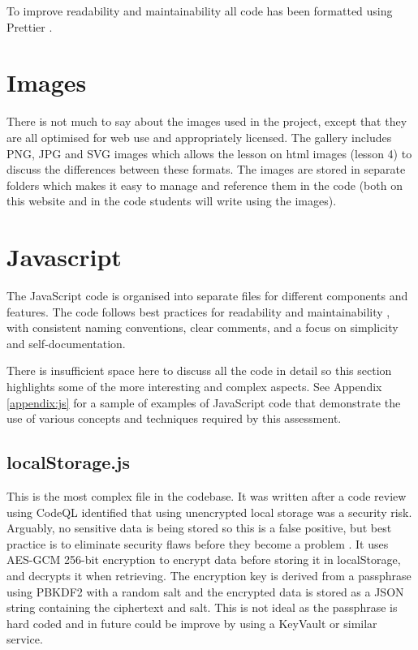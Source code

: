 \documentclass[a4paper, 12pt]{article}
\begin{document}
To improve readability and maintainability all code has been formatted using Prettier \citep{prettier2024}.

\section{Images}
There is not much to say about the images used in the project, except that they are all optimised for web use and appropriately licensed. The gallery includes PNG, JPG and SVG images which allows the lesson on html images (lesson 4) to discuss the differences between these formats. The images are stored in separate folders which makes it easy to manage and reference them in the code (both on this website and in the code students will write using the images).

\section{Javascript}
The JavaScript code is organised into separate files for different components and features. The code follows best practices for readability and maintainability \citep{McConnell2004}, with consistent naming conventions, clear comments, and a focus on simplicity and self-documentation. 

There is insufficient space here to discuss all the code in detail so this section highlights some of the more interesting and complex aspects. See Appendix \ref{appendix:js} for a sample of examples of JavaScript code that demonstrate the use of various concepts and techniques required by this assessment.

\subsection{localStorage.js}
This is the most complex file in the codebase. It was written after a code review using CodeQL \citep{codeql2024} identified that using unencrypted local storage was a security risk. Arguably, no sensitive data is being stored so this is a false positive, but best practice is to eliminate security flaws before they become a problem \citep{owasp2010secure}. It uses AES-GCM 256-bit encryption \citep{nist2001aes} to encrypt data before storing it in localStorage, and decrypts it when retrieving. The encryption key is derived from a passphrase using PBKDF2 with a random salt and the encrypted data is stored as a JSON string containing the ciphertext and salt. This is not ideal as the passphrase is hard coded and in future could be improve by using a KeyVault \citep{microsoft2024keyvault} or similar service.
\end{document}
